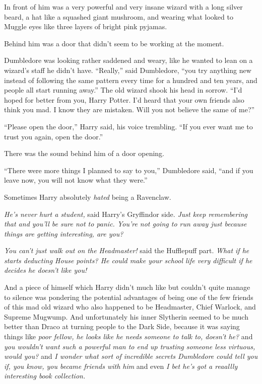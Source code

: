 In front of him was a very powerful and very insane wizard with a long silver beard, a hat like a squashed giant mushroom, and wearing what looked to Muggle eyes like three layers of bright pink pyjamas.

Behind him was a door that didn’t seem to be working at the moment.

Dumbledore was looking rather saddened and weary, like he wanted to lean on a wizard’s staff he didn’t have. “Really,” said Dumbledore, “you try anything new instead of following the same pattern every time for a hundred and ten years, and people all start running away.” The old wizard shook his head in sorrow. “I’d hoped for better from you, Harry Potter. I’d heard that your own friends also think you mad. I know they are mistaken. Will you not believe the same of me?”

“Please open the door,” Harry said, his voice trembling. “If you ever want me to trust you again, open the door.”

There was the sound behind him of a door opening.

“There were more things I planned to say to you,” Dumbledore said, “and if you leave now, you will not know what they were.”

Sometimes Harry absolutely \emph{hated} being a Ravenclaw.

\emph{He’s never hurt a student,} said Harry’s Gryffindor side. \emph{Just keep remembering that and you’ll be sure not to panic. You’re not going to run away just because things are getting interesting, are you?}

\emph{You can’t just walk out on the Headmaster!} said the Hufflepuff part. \emph{What if he starts deducting House points? He could make your school life very difficult if he decides he doesn’t like you!}

And a piece of himself which Harry didn’t much like but couldn’t quite manage to silence was pondering the potential advantages of being one of the few friends of this mad old wizard who also happened to be Headmaster, Chief Warlock, and Supreme Mugwump. And unfortunately his inner Slytherin seemed to be much better than Draco at turning people to the Dark Side, because it was saying things like \emph{poor fellow, he looks like he needs someone to talk to, doesn’t he?} and \emph{you wouldn’t want such a powerful man to end up trusting someone less virtuous, would you?} and \emph{I wonder what sort of incredible secrets Dumbledore could tell you if, you know, you became friends with him} and even \emph{I bet he’s got a reaallly interesting book collection.}

